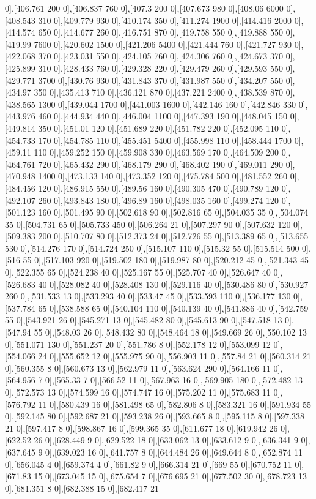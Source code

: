 {0],[406.761 200 0],[406.837 760 0],[407.3 200 0],[407.673 980 0],[408.06 6000 0],[408.543 310 0],[409.779 930 0],[410.174 350 0],[411.274 1900 0],[414.416 2000 0],[414.574 650 0],[414.677 260 0],[416.751 870 0],[419.758 550 0],[419.888 550 0],[419.99 7600 0],[420.602 1500 0],[421.206 5400 0],[421.444 760 0],[421.727 930 0],[422.068 370 0],[423.031 550 0],[424.105 760 0],[424.306 760 0],[424.673 370 0],[425.899 310 0],[428.433 760 0],[429.328 220 0],[429.479 260 0],[429.593 550 0],[429.771 3700 0],[430.76 930 0],[431.843 370 0],[431.987 550 0],[434.207 550 0],[434.97 350 0],[435.413 710 0],[436.121 870 0],[437.221 2400 0],[438.539 870 0],[438.565 1300 0],[439.044 1700 0],[441.003 1600 0],[442.146 160 0],[442.846 330 0],[443.976 460 0],[444.934 440 0],[446.004 1100 0],[447.393 190 0],[448.045 150 0],[449.814 350 0],[451.01 120 0],[451.689 220 0],[451.782 220 0],[452.095 110 0],[454.733 170 0],[454.785 110 0],[455.451 5400 0],[455.998 110 0],[458.444 1700 0],[459.11 110 0],[459.252 150 0],[459.908 330 0],[463.569 170 0],[464.509 200 0],[464.761 720 0],[465.432 290 0],[468.179 290 0],[468.402 190 0],[469.011 290 0],[470.948 1400 0],[473.133 140 0],[473.352 120 0],[475.784 500 0],[481.552 260 0],[484.456 120 0],[486.915 550 0],[489.56 160 0],[490.305 470 0],[490.789 120 0],[492.107 260 0],[493.843 180 0],[496.89 160 0],[498.035 160 0],[499.274 120 0],[501.123 160 0],[501.495 90 0],[502.618 90 0],[502.816 65 0],[504.035 35 0],[504.074 35 0],[504.731 65 0],[505.733 450 0],[506.264 21 0],[507.297 90 0],[507.632 120 0],[509.383 200 0],[510.707 80 0],[512.373 24 0],[512.726 55 0],[513.389 65 0],[513.655 530 0],[514.276 170 0],[514.724 250 0],[515.107 110 0],[515.32 55 0],[515.514 500 0],[516 55 0],[517.103 920 0],[519.502 180 0],[519.987 80 0],[520.212 45 0],[521.343 45 0],[522.355 65 0],[524.238 40 0],[525.167 55 0],[525.707 40 0],[526.647 40 0],[526.683 40 0],[528.082 40 0],[528.408 130 0],[529.116 40 0],[530.486 80 0],[530.927 260 0],[531.533 13 0],[533.293 40 0],[533.47 45 0],[533.593 110 0],[536.177 130 0],[537.784 65 0],[538.588 65 0],[540.104 110 0],[540.139 40 0],[541.886 40 0],[542.759 55 0],[543.921 26 0],[545.271 13 0],[545.482 80 0],[545.613 90 0],[547.518 13 0],[547.94 55 0],[548.03 26 0],[548.432 80 0],[548.464 18 0],[549.669 26 0],[550.102 13 0],[551.071 130 0],[551.237 20 0],[551.786 8 0],[552.178 12 0],[553.099 12 0],[554.066 24 0],[555.652 12 0],[555.975 90 0],[556.903 11 0],[557.84 21 0],[560.314 21 0],[560.355 8 0],[560.673 13 0],[562.979 11 0],[563.624 290 0],[564.166 11 0],[564.956 7 0],[565.33 7 0],[566.52 11 0],[567.963 16 0],[569.905 180 0],[572.482 13 0],[572.573 13 0],[574.599 16 0],[574.747 16 0],[575.202 11 0],[575.683 11 0],[576.792 11 0],[580.439 16 0],[581.498 65 0],[582.806 8 0],[583.321 16 0],[591.934 55 0],[592.145 80 0],[592.687 21 0],[593.238 26 0],[593.665 8 0],[595.115 8 0],[597.338 21 0],[597.417 8 0],[598.867 16 0],[599.365 35 0],[611.677 18 0],[619.942 26 0],[622.52 26 0],[628.449 9 0],[629.522 18 0],[633.062 13 0],[633.612 9 0],[636.341 9 0],[637.645 9 0],[639.023 16 0],[641.757 8 0],[644.484 26 0],[649.644 8 0],[652.874 11 0],[656.045 4 0],[659.374 4 0],[661.82 9 0],[666.314 21 0],[669 55 0],[670.752 11 0],[671.83 15 0],[673.045 15 0],[675.654 7 0],[676.695 21 0],[677.502 30 0],[678.723 13 0],[681.351 8 0],[682.388 15 0],[682.417 21 }
